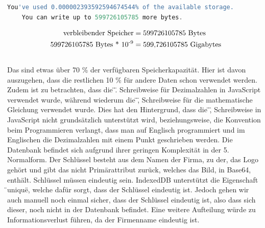 \newline
\begin{lstlisting}[language=JavaScript,label={lst:JavaScript IndexedDB Speichergröße Ergebnis}]
    You've used 0.000002393592594674544% of the available storage.
    You can write up to 599726105785 more bytes.
\end{lstlisting}
\newline
\newline
\begin{equation}
    \begin{aligned}
       \text{verbleibender Speicher} &= \text{599726105785 Bytes}\\
       \newline
       \text{599726105785 Bytes} \text{ * 10}\textsuperscript{-9} &= \text{599,726105785 Gigabytes}\\
        \newline
        \newline
    \end{aligned}
\end{equation}
\newline
\newline
Das sind etwas über 70 \%\) der verfügbaren Speicherkapazität.
Hier ist davon auszugehen, dass die restlichen 10 \%\) für andere Daten schon verwendet werden.
Zudem ist zu betrachten, dass die \"\).\"\) Schreibweise für Dezimalzahlen in JavaScript verwendet wurde, während wiederum die \"\),\"\) Schreibweise für die mathematische Gleichung verwendet wurde.
Dies hat den Hintergrund, dass die \"\),\"\) Schreibweise in JavaScript nicht grundsätzlich unterstützt wird, beziehungsweise, die Konvention beim Programmieren verlangt, dass man auf Englisch programmiert und im Englischen die Dezimalzahlen mit einem Punkt geschrieben werden.
\newline
\newline
Die Datenbank befindet sich aufgrund ihrer geringen Komplexität in der 5. Normalform.
Der Schlüssel besteht aus dem Namen der Firma, zu der, das Logo gehört und gibt das nicht Primärattribut zurück, welches das Bild, in Base64, enthält.
Schlüssel müssen eindeutig sein.
IndexedDB unterstützt die Eigenschaft \"\)unique\"\), welche dafür sorgt, dass der Schlüssel eindeutig ist.
Jedoch gehen wir auch manuell noch einmal sicher, dass der Schlüssel eindeutig ist, also dass sich dieser, noch nicht in der Datenbank befindet.
Eine weitere Aufteilung würde zu Informationsverlust führen, da der Firmenname eindeutig ist.
\newline
